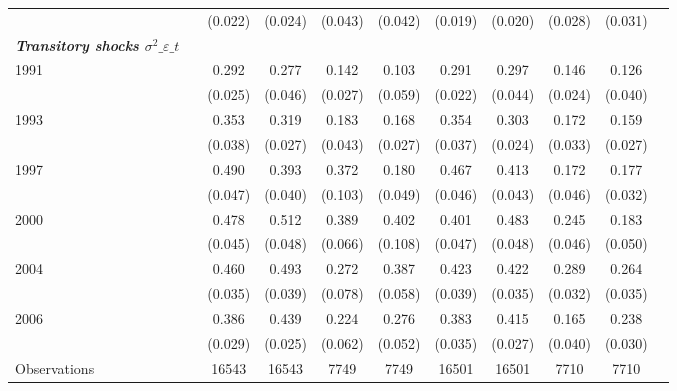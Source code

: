 \begin{tabular}{l*{10}{c}}
                    &            &     (0.022)&     (0.024)&     (0.043)&     (0.042)&     (0.019)&     (0.020)&     (0.028)&     (0.031)\\
\textbf{\emph{Transitory shocks $\sigma^2\_{\varepsilon\_t}$}}&            &            &            &            &            &            &            &            &            \\
\hspace{.3cm} 1991  &            &       0.292&       0.277&       0.142&       0.103&       0.291&       0.297&       0.146&       0.126\\
                    &            &     (0.025)&     (0.046)&     (0.027)&     (0.059)&     (0.022)&     (0.044)&     (0.024)&     (0.040)\\
\hspace{.3cm} 1993  &            &       0.353&       0.319&       0.183&       0.168&       0.354&       0.303&       0.172&       0.159\\
                    &            &     (0.038)&     (0.027)&     (0.043)&     (0.027)&     (0.037)&     (0.024)&     (0.033)&     (0.027)\\
\hspace{.3cm} 1997  &            &       0.490&       0.393&       0.372&       0.180&       0.467&       0.413&       0.172&       0.177\\
                    &            &     (0.047)&     (0.040)&     (0.103)&     (0.049)&     (0.046)&     (0.043)&     (0.046)&     (0.032)\\
\hspace{.3cm} 2000  &            &       0.478&       0.512&       0.389&       0.402&       0.401&       0.483&       0.245&       0.183\\
                    &            &     (0.045)&     (0.048)&     (0.066)&     (0.108)&     (0.047)&     (0.048)&     (0.046)&     (0.050)\\
\hspace{.3cm} 2004  &            &       0.460&       0.493&       0.272&       0.387&       0.423&       0.422&       0.289&       0.264\\
                    &            &     (0.035)&     (0.039)&     (0.078)&     (0.058)&     (0.039)&     (0.035)&     (0.032)&     (0.035)\\
\hspace{.3cm} 2006  &            &       0.386&       0.439&       0.224&       0.276&       0.383&       0.415&       0.165&       0.238\\
                    &            &     (0.029)&     (0.025)&     (0.062)&     (0.052)&     (0.035)&     (0.027)&     (0.040)&     (0.030)\\
\midrule
Observations        &            &       16543&       16543&        7749&        7749&       16501&       16501&        7710&        7710\\
\bottomrule
\end{tabular}
